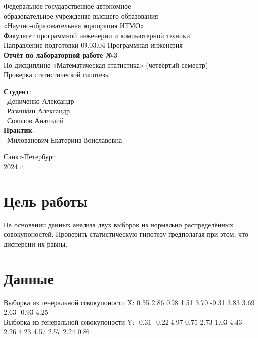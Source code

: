 \documentclass{article}
\begin{document}
\begin{center}
    \Large
    Федеральное государственное автономное \\
    образовательное учреждение высшего образования \\ 
    «Научно-образовательная корпорация ИТМО»\\
    \vspace{0.5cm}
    \large
    Факультет программной инженерии и компьютерной техники \\
    Направление подготовки 09.03.04 Программная инженерия \\
    \vspace{1cm}
    \Large
    \textbf{Отчёт по лабораторной работе №3} \\
    По дисциплине «Математическая статистика» (четвёртый семестр)\\
    Проверка статистической гипотезы\\
    \large
    \vspace{8cm}

    \begin{minipage}{.33\textwidth}
    \end{minipage}
    \hfill
    \begin{minipage}{.4\textwidth}
    
        \textbf{Студент}: \vspace{.1cm} \\
        \ Дениченко Александр\\
        \ Разинкин Александр\\
        \ Соколов Анатолий\\
        \textbf{Практик}:  \\
        \ Милованович Екатерина Воиславовна
    \end{minipage}
    \vfill
Санкт-Петербург\\ 2024 г.
\end{center}
\thispagestyle{empty}

\newpage
\section*{Цель работы}
На основании данных анализа двух выборок из нормально распределённых совокупоностей. Проверить статистическую гипотезу предполагая при этом, что дисперсии их равны.
\section*{Данные }
Выборка из генеральной совокупоности X: 0.55 2.86 0.98 1.51 3.70 -0.31 3.83 3.69 2.63 -0.93 4.25\\
Выборка из генеральной совокупоности Y: -0.31 -0.22 4.97 0.75 2.73 1.03 4.43 2.26 4.23 4.57 2.57 2.24 0.86
\end{document}

